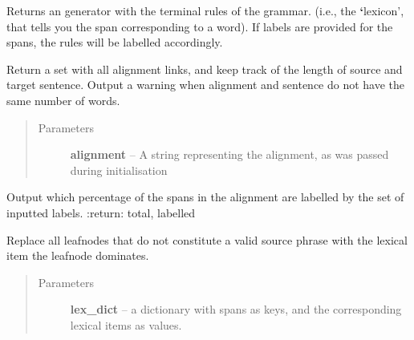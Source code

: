 \documentclass[letterpaper,10pt,english]{sphinxmanual}
\begin{document}
\begin{fulllineitems}
\begin{fulllineitems}
\label{alignments:alignments.Alignments.lexrules}
Returns an generator with the terminal rules
of the grammar. (i.e., the {\color{red}\bfseries{}{}`}lexicon', that tells 
you the span corresponding to a word).
If labels are provided for the spans, the rules
will be labelled accordingly.
\begin{quote}\begin{description}
\end{description}\end{quote}

\end{fulllineitems}


\begin{fulllineitems}
\label{alignments:alignments.Alignments.make_set}
Return a set with all alignment links, and keep track of 
the length of source and target sentence.
Output a warning when alignment and sentence do not have
the same number of words.
\begin{quote}\begin{description}
\item[{Parameters}] \leavevmode
\textbf{alignment} -- A string representing the alignment, as was passed during
initialisation

\end{description}\end{quote}

\end{fulllineitems}


\begin{fulllineitems}
\label{alignments:alignments.Alignments.percentage_labelled}
Output which percentage of the spans in the alignment
are labelled by the set of inputted labels.
:return:        total, labelled

\end{fulllineitems}


\begin{fulllineitems}
\label{alignments:alignments.Alignments.prune_production}
Replace all leafnodes that do not constitute
a valid source phrase with the lexical item the
leafnode dominates.
\begin{quote}\begin{description}
\item[{Parameters}] \leavevmode
\textbf{lex\_dict} -- a dictionary with spans as keys, and the corresponding
lexical items as values.


\end{description}
\end{quote}
\end{fulllineitems}
\end{fulllineitems}
\end{document}
